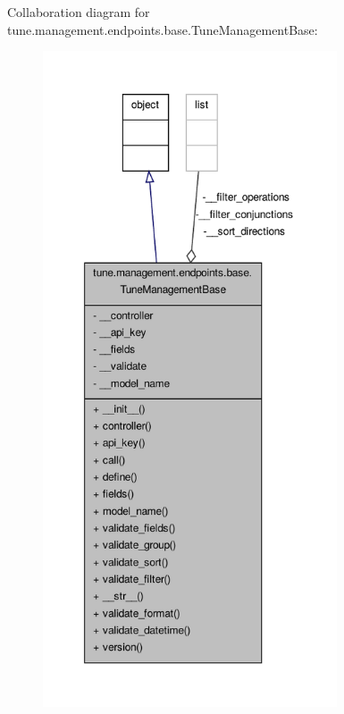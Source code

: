 Collaboration diagram for tune.\-management.\-endpoints.\-base.\-Tune\-Management\-Base\-:
\nopagebreak
\begin{figure}[H]
\begin{center}
\leavevmode
\includegraphics[height=550pt]{classtune_1_1management_1_1endpoints_1_1base_1_1TuneManagementBase__coll__graph}
\end{center}
\end{figure}
